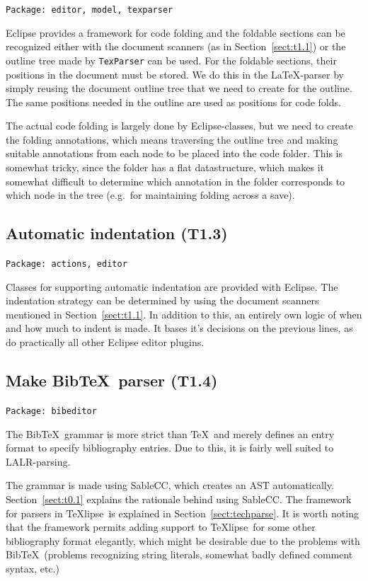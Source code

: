\documentclass[a4paper,11pt,twoside]{article}
\newcommand{\texlipse}{\TeX lipse}
\begin{document}
\texttt{Package: editor, model, texparser}

Eclipse provides a framework for code folding and the foldable sections can be 
recognized either with the document scanners (as in Section~\ref{sect:t1.1}) or 
the outline tree made by \texttt{TexParser} can be used. For the foldable 
sections, their positions in the document must be stored. We do this in the 
\LaTeX -parser by simply reusing the document outline tree that we need to 
create for the outline. The same positions needed in the outline are used as 
positions for code folds.

The actual code folding is largely done by Eclipse-classes, but we need to 
create the folding annotations, which means traversing the outline tree and 
making suitable annotations from each node to be placed into the code folder. 
This is somewhat tricky, since the folder has a flat datastructure, which makes 
it somewhat difficult to determine which annotation in the folder corresponds 
to which node in the tree (e.g.\ for maintaining folding across a save).


\subsection{Automatic indentation (T1.3)}
\label{sec:t1.3}

\texttt{Package: actions, editor}

Classes for supporting automatic indentation are provided with Eclipse. The 
indentation strategy can be determined by using the document scanners mentioned 
in Section~\ref{sect:t1.1}. In addition to this, an entirely own logic of when 
and how much to indent is made. It bases it's decisions on the previous lines, 
as do practically all other Eclipse editor plugins.


\subsection{Make Bib\TeX\ parser (T1.4)}

\texttt{Package: bibeditor}

The Bib\TeX\ grammar is more strict than \TeX\ and merely defines an entry 
format to specify bibliography entries. Due to this, it is fairly well suited 
to LALR-parsing.

The grammar is made using SableCC, which creates an AST automatically. 
Section~\ref{sect:t0.1} explains the rationale behind using SableCC. The 
framework for parsers in \texlipse\ is explained in 
Section~\ref{sect:techparse}. It is worth noting that the framework permits 
adding support to \texlipse\ for some other bibliography format elegantly, 
which might be desirable due to the problems with Bib\TeX\ (problems recognizing 
string literals, somewhat badly defined comment syntax, etc.)
\end{document}
